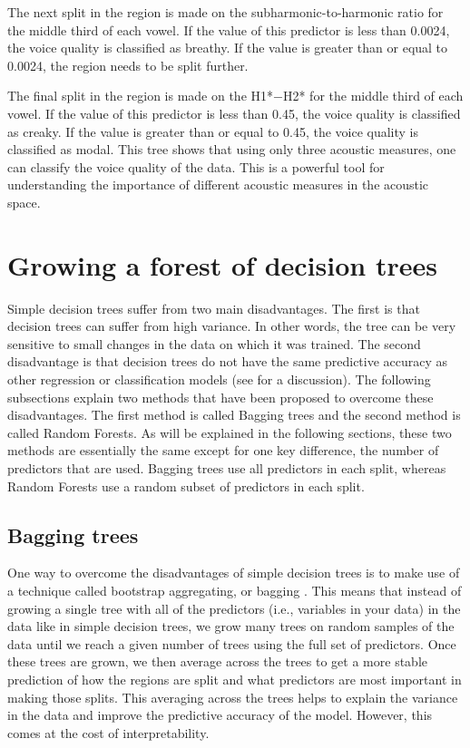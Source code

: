 The next split in the region is made on the subharmonic-to-harmonic ratio for the middle third of each vowel. If the value of this predictor is less than 0.0024, the voice quality is classified as breathy. If the value is greater than or equal to 0.0024, the region needs to be split further.

The final split in the region is made on the H1*$-$H2* for the middle third of each vowel. If the value of this predictor is less than 0.45, the voice quality is classified as creaky. If the value is greater than or equal to 0.45, the voice quality is classified as modal. This tree shows that using only three acoustic measures, one can classify the voice quality of the data. This is a powerful tool for understanding the importance of different acoustic measures in the acoustic space. 

\section{Growing a forest of decision trees} \label{sec:growing_forest}

Simple decision trees suffer from two main disadvantages. The first is that decision trees can suffer from high variance. In other words, the tree can be very sensitive to small changes in the data on which it was trained. The second disadvantage is that decision trees do not have the same predictive accuracy as other regression or classification models (see \cite{hastieElementsStatisticalLearning2009} for a discussion). The following subsections explain two methods that have been proposed to overcome these disadvantages. The first method is called Bagging trees and the second method is called Random Forests. As will be explained in the following sections, these two methods are essentially the same except for one key difference, the number of predictors that are used. Bagging trees use all predictors in each split, whereas Random Forests use a random subset of predictors in each split. 

\subsection{Bagging trees} \label{sec:bagging_bagging}
One way to overcome the disadvantages of simple decision trees is to make use of a technique called bootstrap aggregating, or bagging \citep{breimanBaggingPredictors1996}. This means that instead of growing a single tree with all of the predictors (i.e., variables in your data) in the data like in simple decision trees, we grow many trees on random samples of the data until we reach a given number of trees using the full set of predictors. Once these trees are grown, we then average across the trees to get a more stable prediction of how the regions are split and what predictors are most important in making those splits. This averaging across the trees helps to explain the variance in the data and improve the predictive accuracy of the model. However, this comes at the cost of interpretability. 

